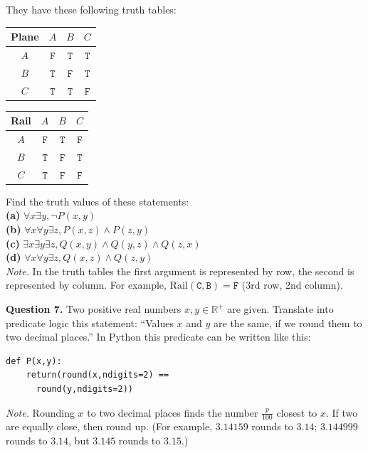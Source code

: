 \documentclass[jou]{apa6}
\begin{document}
They have these following truth tables:
\begin{center}
\begin{tabular}{c|ccc}
Plane & $A$ & $B$ & $C$ \\ \hline
$A$ & $\mathtt{F}$ & $\mathtt{T}$ & $\mathtt{T}$ \\
$B$ & $\mathtt{T}$ & $\mathtt{F}$ & $\mathtt{T}$ \\
$C$ & $\mathtt{T}$ & $\mathtt{T}$ & $\mathtt{F}$
\end{tabular}
\hspace{2ex}
\begin{tabular}{c|ccc}
Rail & $A$ & $B$ & $C$ \\ \hline
$A$ & $\mathtt{F}$ & $\mathtt{T}$ & $\mathtt{F}$ \\
$B$ & $\mathtt{T}$ & $\mathtt{F}$ & $\mathtt{T}$ \\
$C$ & $\mathtt{T}$ & $\mathtt{F}$ & $\mathtt{F}$
\end{tabular}
\end{center}
Find the truth values of these statements:\\
{\bf (a)} $\forall x \exists y, \neg P(x,y)$\\
{\bf (b)} $\forall x \forall y \exists z, P(x,z) \wedge P(z,y)$\\
{\bf (c)} $\exists x \exists y \exists z, Q(x,y) \wedge Q(y,z) \wedge Q(z,x)$\\
{\bf (d)} $\forall x \forall y \exists z, Q(x,z) \wedge Q(z,y)$\\
{\em Note.} In the truth tables the first argument is
represented by row, the second is represented by column. 
For example, $\mathrm{Rail}(\mathtt{C}, \mathtt{B}) = \mathtt{F}$ (3rd row,
2nd column).



\vspace{40pt}
{\bf Question 7.} 
Two positive real numbers $x,y \in \mathbb{R}^{+}$ are given. 
Translate into predicate logic this statement:
``Values $x$ and $y$ are the same, if we round them to two 
decimal places.'' In Python this predicate can be written like this:
\begin{verbatim}
def P(x,y):
    return(round(x,ndigits=2) == 
      round(y,ndigits=2))
\end{verbatim}
{\em Note.} Rounding $x$ to two decimal places finds the 
number $\frac{p}{100}$ closest to $x$. 
If two are equally close, then round up.
(For example, $3.14159$ rounds to $3.14$; $3.144999$ rounds to $3.14$, 
but $3.145$ rounds to $3.15$.)
\end{document}
